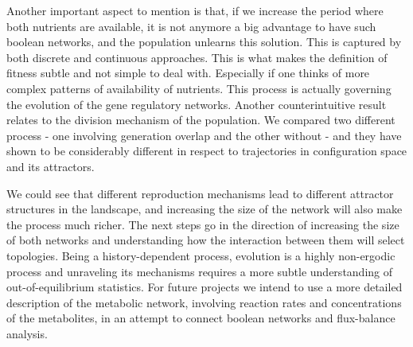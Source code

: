 \documentclass{article}
\begin{document}
Another important aspect to mention is that, if we increase the period where both nutrients are available, it is not anymore a big advantage to have such boolean 
networks, and the population unlearns this solution. This is captured by both discrete and continuous approaches. This is  what makes the definition of fitness subtle 
and not simple to deal with. Especially if one thinks of more complex patterns of availability of nutrients. This process is actually governing the evolution of the 
gene regulatory networks. Another counterintuitive result relates to the division mechanism of the population. We compared two different process - one involving 
generation overlap and the other without - and they have shown to be considerably different in respect to trajectories in configuration space and its attractors. 

We could see that different reproduction mechanisms lead to different attractor structures in the landscape, and increasing the size of the network will also
make the process much richer. The next steps go in the direction of increasing the size of both networks and understanding how the interaction between them 
will select topologies. Being a history-dependent process, evolution is a highly non-ergodic process and unraveling its mechanisms requires a more subtle understanding 
of out-of-equilibrium statistics. For future projects we intend to use a more detailed description of the metabolic network, involving reaction rates and concentrations 
of the metabolites, in an attempt to connect boolean networks and flux-balance analysis.
\end{document}
